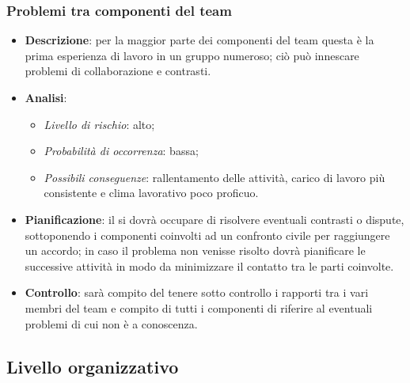 		\subsubsection{Problemi tra componenti del team}
			\begin{itemize}
				\item \textbf{Descrizione}: per la maggior parte dei componenti del team questa è la prima esperienza di lavoro in un gruppo numeroso; ciò può  innescare problemi di collaborazione e contrasti.
				\item \textbf{Analisi}:
				\begin{itemize}
					\item \textit{Livello di rischio}: alto;
					\item \textit{Probabilità di occorrenza}: bassa;
					\item \textit{Possibili conseguenze}: rallentamento delle attività, carico di lavoro più consistente e clima lavorativo poco proficuo.
				\end{itemize}
				\item \textbf{Pianificazione}: il  si dovrà occupare di risolvere eventuali contrasti o dispute, sottoponendo i componenti coinvolti ad un confronto civile per raggiungere un accordo; in caso il problema non venisse risolto dovrà pianificare le successive attività in modo da minimizzare il contatto tra le parti coinvolte.
				\item \textbf{Controllo}: sarà compito del  tenere sotto controllo i rapporti tra i vari membri del team e compito di tutti i componenti di riferire al  eventuali problemi di cui non è a conoscenza.
			\end{itemize}
	\subsection{Livello organizzativo}
